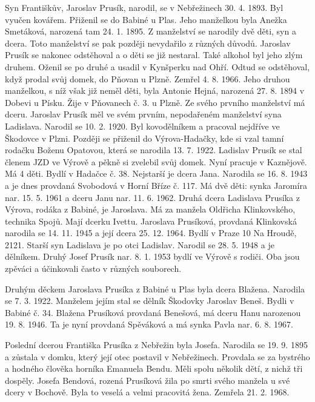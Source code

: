 \documentclass[../dejiny-rodu-prusiku.tex]{subfiles}
\begin{document}
Syn Františkův, Jaroslav Prusík, narodil, se v Nebřežinech 30. 4. 1893. Byl vyučen kovářem. Přiženil se do Babiné u Plas. Jeho manželkou byla Anežka Smetáková, narozená tam 24. 1. 1895. Z manželství se narodily dvě děti, syn a dcera. Toto manželství se pak později nevydařilo z různých důvodů. Jaroslav Prusík se nakonec odstěhoval a o děti se již nestaral. Také alkohol byl jeho zlým druhem. Oženil se po druhé a usadil v Kynšperku nad Ohří. Odtud se odstěhoval, když prodal svůj domek, do Pňovan u Plzně. Zemřel 4. 8. 1966. Jeho druhou manželkou, s níž však již neměl děti, byla Antonie Hejná, narozená 27. 8. 1894 v Dobevi u Písku. Žije v Pňovanech č. 3. u Plzně. Ze svého prvního manželství má dceru. Jaroslav Prusík měl ve svém prvním, nepodařeném manželství syna Ladislava. Narodil se 10. 2. 1920. Byl kovodělníkem a pracoval nejdříve ve Škodovce v Plzni. Později se přiženil do Výrova-Hadačky, kde si vzal tamní rodačku Boženu Opatovou, která se narodila 13. 7. 1922.  Ladislav Prusík se stal členem JZD ve Výrově a pěkně si zvelebil svůj domek. Nyní pracuje v Kaznějově. Má 4 děti. Bydlí v Hadačce č. 38. Nejstarší je dcera Jana. Narodila se 16. 8. 1943 a je dnes provdaná Svobodová v Horní Bříze č. 117. Má dvě děti: synka Jaromíra nar. 15. 5. 1961 a dceru Janu nar. 11. 6. 1962. Druhá dcera Ladislava Prusíka z Výrova, rodáka z Babiné, je Jaroslava. Má za manžela Oldřicha Klinkovského, technika Spojů. Mají dcerku Ivettu. Jaroslava Prusíková, provdaná Klinkovská na­rodila se 14. 11. 1945 a její dcera 25. 12. 1964. Bydlí v Praze 10 Na Hroudě, 2121. Starší syn Ladislava je po otci Ladislav. Narodil se 28. 5. 1948 a je dělníkem. Druhý Josef Prusík nar. 8. 1. 1953 bydlí ve Výrově s rodiči. Oba jsou zpěváci a  účinkovali často v různých souborech.

Druhým děckem Jaroslava Prusíka z Babiné u Plas byla dcera Blažena. Narodila se 7. 3. 1922. Manželem jejím stal se dělník Škodovky Jaroslav Beneš. Bydli v Babiné č. 34. Blažena Prusíková provdaná Benešová, má dceru Hanu narozenou 19. 8. 1946. Ta je nyní provda­ná Spěváková a má synka Pavla nar. 6. 8. 1967.

Poslední dcerou Františka Prusíka z Nebřežin byla Josefa. Narodila se 19. 9. 1895 a zůstala v domku, který její otec postavil v Nebřežinech. Provdala se za bystrého a hodného člověka horníka Emanuela Bendu. Měli spolu několik dětí, z nichž tři dospěly. Josefa Bendová, rozená Prusíková žila po smrti svého manžela u své dcery v Bochově. Byla to veselá a velmi pracovitá žena. Zemřela 21. 2. 1968.
\end{document}
